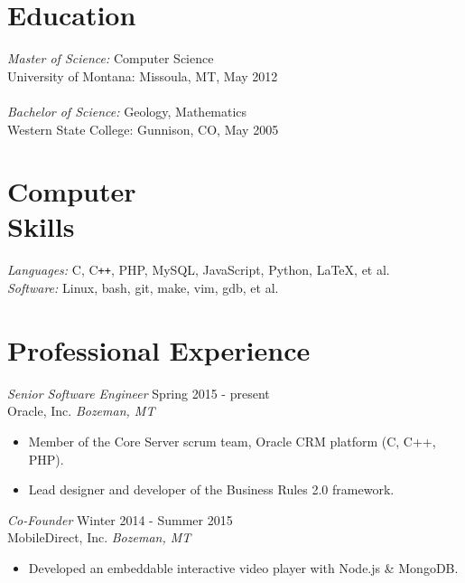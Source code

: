 \documentclass[line,margin]{res}
\begin{document}
\address{\texttt{perry@rphv.net} | 406.848.1774  }
\address{219 S. Bozeman Ave, Bozeman, MT 59715}
 
\begin{resume}
 
\section{\sc Education} 
        {\sl Master of Science:} Computer Science\\
        University of Montana: Missoula, MT, May 2012\\
        \\
        {\sl Bachelor of Science:} Geology, Mathematics \\
        Western State College: Gunnison, CO, May 2005 \\
 
\section{\sc Computer \\ Skills}    
        {\sl Languages:} C, C\verb!++!, PHP, MySQL, JavaScript, Python, \LaTeX, et al.\\
        {\sl Software:} Linux, bash, git, make, vim, gdb, et al.\\

\section{\sc Professional Experience} 

        {\sl Senior Software Engineer} \hfill  Spring 2015 - present\\
        Oracle, Inc. \hfill {\sl Bozeman, MT}
        \begin{itemize} \itemsep -2pt
            \item Member of the Core Server scrum team, Oracle CRM platform (C, C++, PHP).
            \item Lead designer and developer of the Business Rules 2.0 framework.
        \end{itemize}

        {\sl Co-Founder} \hfill  Winter 2014 - Summer 2015\\
        MobileDirect, Inc. \hfill {\sl Bozeman, MT}
        \begin{itemize} \itemsep -2pt
            \item Developed an embeddable interactive video player with Node.js \& MongoDB.
        \end{itemize}


\end{resume}
\end{document}
